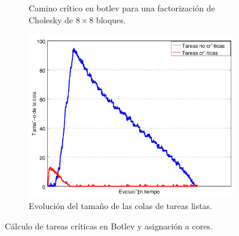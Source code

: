 \begin{figure}
  \centering
  
  \begin{subfigure}{.45\textwidth}
    \centering
    \setlength{\fboxsep}{5pt}
    \caption{Camino crítico en botlev para una factorización de Cholesky de
      $8\times8$ bloques.}
    \label{s3:fig:botlev_tdg}
  \end{subfigure}
  \begin{subfigure}{.47\textwidth}
    \centering
    \includegraphics[width=1\linewidth]{Figures/botlev-colas.png}
    \caption{Evolución del tamaño de las colas de tareas
      listas.}
    \label{s3:fig:botlev_colas}
  \end{subfigure}  
  
  \caption{Cálculo de tareas críticas en Botlev y asignación a cores.}
  \label{s3:fig:botlev}
\end{figure}

